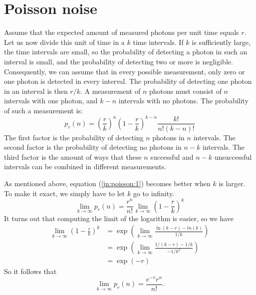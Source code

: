 \documentclass[11pt,oneside]{book}
\begin{document}
\section{Poisson noise} \label{app:poisson}
Assume that the expected amount of measured photons per unit time equals $r$.
Let us now divide this unit of time in a $k$ time intervals. If $k$ is
sufficiently large, the time intervals are small, so the probability of
detecting a photon in such an interval is small, and the probability of
detecting two or more is negligible. Consequently, we can assume that in every
possible measurement, only zero or one photon is detected in every
interval. The probability of detecting one photon in an interval is then $r /
k$. A measurement of $n$ photons must consist of $n$ intervals with one
photon, and $k - n$ intervals with no photons. The probability of such a
measurement is:
\begin{equation}
p_r(n) = \left( \frac{r}{k} \right)^n \left(1 - \frac{r}{k} \right)^{k-n}
       \frac{k!}{n!(k-n)!} 
\label{jn:poisson:1}
\end{equation}
The first factor is the probability of detecting $n$ photons in $n$ intervals.
The second factor is the probability of detecting no photons in $n - k$
intervals.  The third factor is the amount of ways that these $n$ successful
and $n-k$ unsuccessful intervals can be combined in different measurements.

As mentioned above, equation (\ref{jn:poisson:1}) becomes better when $k$ is
larger.  To make it exact, we simply have to let $k$ go to infinity.
\begin{equation}
  \lim_{k \rightarrow \infty} p_r(n) 
  = \frac{r^n}{n!} \lim_{k \rightarrow \infty} \left( 1 - \frac{r}{k} \right)^k
\end{equation}
It turns out that computing the limit of the logarithm is easier, so we have
\begin{align}
  \lim_{k \rightarrow \infty} \left( 1 - \frac{r}{k} \right)^k
 &=
 \exp \left(\lim_{k \rightarrow \infty} \frac{\ln(k - r) - ln(k)}{1/k}  \right)
\nonumber\\
&= 
  \exp \left(\lim_{k \rightarrow \infty}  
  \frac{1/ (k-r) - 1/k}{-1/k^2} \right) \nonumber \\
&= \exp (-r)
\end{align}
So it follows that 
\begin{equation}
  \lim_{k \rightarrow \infty} p_r(n) = \frac{e^{-r} r^n}{n!}. 
\end{equation}
\end{document}

